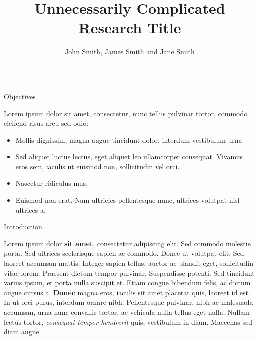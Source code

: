 \documentclass{beamer}
\title{Unnecessarily Complicated Research Title} %
\author{John Smith, James Smith and Jane Smith} %
\institute{Department and University Name} %
\begin{document}
\begin{frame}[t,fragile] 

\begin{columns}[t]

\begin{column}{\textwidth} %


\begin{alertblock}{Objectives}

Lorem ipsum dolor sit amet, consectetur, nunc tellus pulvinar tortor, commodo eleifend risus arcu sed odio:
\begin{itemize}
\item Mollis dignissim, magna augue tincidunt dolor, interdum vestibulum urna
\item Sed aliquet luctus lectus, eget aliquet leo ullamcorper consequat. Vivamus eros sem, iaculis ut euismod non, sollicitudin vel orci.
\item Nascetur ridiculus mus.  
\item Euismod non erat. Nam ultricies pellentesque nunc, ultrices volutpat nisl ultrices a.
\end{itemize}

\end{alertblock}


\begin{block}{Introduction}

Lorem ipsum dolor \textbf{sit amet}, consectetur adipiscing elit. Sed commodo molestie porta. Sed ultrices scelerisque sapien ac commodo. Donec ut volutpat elit. Sed laoreet accumsan mattis. Integer sapien tellus, auctor ac blandit eget, sollicitudin vitae lorem. Praesent dictum tempor pulvinar. Suspendisse potenti. Sed tincidunt varius ipsum, et porta nulla suscipit et. Etiam congue bibendum felis, ac dictum augue cursus a. \textbf{Donec} magna eros, iaculis sit amet placerat quis, laoreet id est. In ut orci purus, interdum ornare nibh. Pellentesque pulvinar, nibh ac malesuada accumsan, urna nunc convallis tortor, ac vehicula nulla tellus eget nulla. Nullam lectus tortor, \textit{consequat tempor hendrerit} quis, vestibulum in diam. Maecenas sed diam augue.


\end{block}
\end{column}
\end{columns}
\end{frame}
\end{document}
